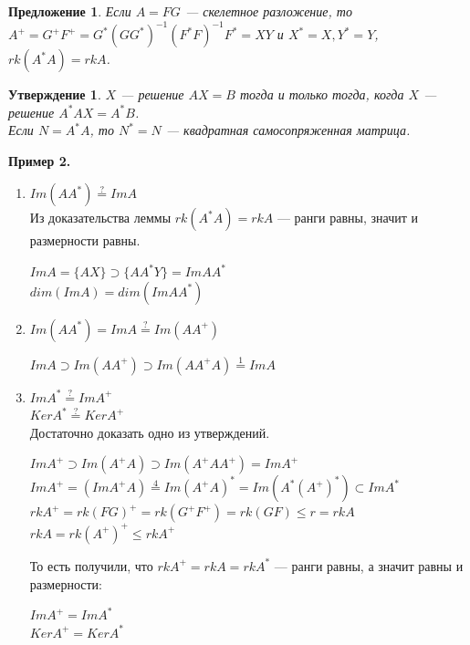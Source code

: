\documentclass[12pt]{article}
\newtheorem*{proposal}{Предложение}
\newtheorem*{statement}{Утверждение}
\begin{document}
	\begin{proposal}
	Если $A=FG$ --- скелетное разложение, то 
	$A^+=G^+F^+=G^*(GG^*)^{-1}(F^*F)^{-1}F^*=XY$ и 
	$X^*=X, Y^*=Y$, 
	$rk(A^*A)=rkA$.
	\end{proposal}
	\begin{statement}
	$X$ --- решение $AX=B$ тогда и только тогда, когда $X$ --- решение $A^*AX=A^*B$.\\
	Если $N=A^*A$, то $N^*=N$ --- квадратная самосопряженная матрица.
	\end{statement}
	\textbf{Пример 2.}\begin{enumerate}
		\item $Im(AA^*)\overset{?}{=}ImA$\\
		Из доказательства леммы $rk(A^*A)=rkA$ --- ранги равны, значит и размерности равны.
		\begin{center} $ImA=\{AX\} \supset \{AA^*Y\}=ImAA^*$\\
			$dim(ImA)=dim(ImAA^*)$
		\end{center}
		\item $Im(AA^*)=ImA\overset{?}{=}Im(AA^+)$
		\begin{center}
			$ImA\supset Im(AA^+) \supset Im(AA^+A) \overset{1}{=} ImA$
		\end{center}
		\item $ImA^* \overset{?}{=} ImA^+$\\
		$KerA^* \overset{?}{=} KerA^+$\\
		Достаточно доказать одно из утверждений.
		\begin{center}
			$ImA^+ \supset Im(A^+A) \supset Im(A^+AA^+) = ImA^+$\\
			$ImA^+=(ImA^+A) \overset{4}{=} Im(A^+A)^* = Im(A^*(A^+)^*) \subset ImA^*$\\
			$rkA^+=rk(FG)^+=rk(G^+F^+)=rk(GF) \leqslant r = rkA$\\
			$rkA=rk(A^+)^+ \leqslant rk A^+$
		\end{center}
		То есть получили, что $rkA^+=rkA=rkA^*$ --- ранги равны, а значит равны и размерности:
		\begin{center}
			$ImA^+=ImA^*$\\
			$KerA^+=KerA^*$
		\end{center}
	\end{enumerate}
\end{document}

